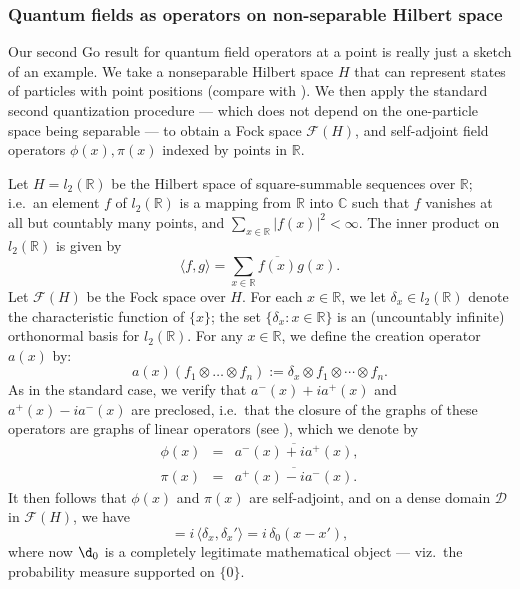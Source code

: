 \documentclass[11pt]{article}
\newcommand{\abs}[1]{|#1|}
\theoremstyle{definition}
\theoremstyle{definition}
\theoremstyle{remark}
\def\2#1{{\mathcal #1}}
\def\7#1{{\mathbb #1}}
\begin{document}
\subsubsection{Quantum fields as operators on non-separable Hilbert space}
\label{aleph}

Our second Go result for quantum field operators at a point is really just a sketch
of an example.  We take a nonseparable Hilbert space $H$ that can represent states of
particles with point positions (compare with \cite{hans}).  We then apply the
standard second quantization procedure --- which does not depend on the one-particle
space being separable --- to obtain a Fock space $\2F (H)$, and self-adjoint field
operators $\phi (x),\pi (x)$ indexed by points in $\7R$.

Let $H=l_2(\mathbb{R})$ be the Hilbert space of square-summable sequences over $\7R$;
i.e.\ an element $f$ of $l_2(\7R )$ is a mapping from $\7R$ into $\7C$ such that $f$
vanishes at all but countably many points, and $\sum _{x\in
  \mathbb{R}}\abs{f(x)}^{2}<\infty $.  The inner product on $l_2(\mathbb{R})$ is
given by
\begin{equation}
  \langle f,g\rangle = \sum _{x\in \mathbb{R}}\overline{f(x)}g(x)
  .\end{equation} 
Let $\2F (H)$ be the Fock space over $H$.  For each $x\in
\mathbb{R}$, we let $\delta _x \in l_2(\7R )$ denote the
characteristic function of $\{ x\}$; the set $\{ \delta _x:x\in
\mathbb{R}\}$ is an (uncountably infinite) orthonormal basis for
$l_2(\mathbb{R})$.  For any $x\in \7R$, we define the creation
operator $a(x)$ by:
\begin{equation}
  a(x)(f_1\otimes \dots \otimes f_n) := \delta _x \otimes f_1 \otimes \cdots \otimes
  f_n .\end{equation}
As in the standard case, we verify that $a^-(x)+ia^+(x)$ and
$a^{+}(x)-ia^-(x)$ are preclosed, i.e.\
that the closure of the graphs of these operators are
graphs of linear operators (see \cite[p.\ 155]{kr}), which we denote by 
\begin{eqnarray}
  \phi (x) &= & \overline{a^-(x)+ia^+(x)} , \\
  \pi (x) &= & \overline{a^+(x)-ia^-(x)} .\end{eqnarray}
It then follows that $\phi (x)$ and $\pi (x)$ are self-adjoint, and on a dense domain
$\2D$ in $\2F (H)$, we have 
\begin{equation} [\pi (x) ,\phi (x')]= i \,\langle\delta _x,\delta
  _x'\rangle = i\,\delta _0(x-x') ,\end{equation} where now $\d _0$ is
a completely legitimate mathematical object --- viz.\ the probability
measure supported on $\{ 0\}$.
\end{document}
